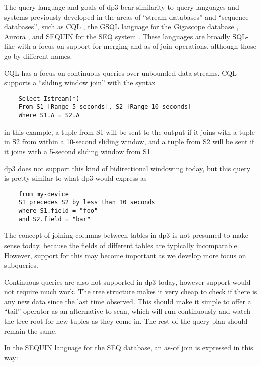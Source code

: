 \documentclass[9pt,twocolumn]{article}
\newcommand{\q}[1]{``#1''}
\begin{document}
    The query language and goals of dp3 bear similarity to query languages and
    systems previously developed in the areas of \q{stream databases} and
    \q{sequence databases}, such as CQL \cite{cql}, the GSQL language for the
    Gigascope database \cite{gigascope}, Aurora \cite{aurora}, and SEQUIN for
    the SEQ system \cite{seq}. These languages are broadly SQL-like with a focus on
    support for merging and as-of join operations, although those go by
    different names.

    CQL has a focus on continuous queries over unbounded data streams. CQL
    supports a \q{sliding window join} with the syntax 

    \begin{lstlisting}
    Select Istream(*)
    From S1 [Range 5 seconds], S2 [Range 10 seconds]
    Where S1.A = S2.A
    \end{lstlisting}

    in this example, a tuple from S1 will be sent to the output if it joins with
    a tuple in S2 from within a 10-second sliding window, and a tuple from S2 will
    be sent if it joins with a 5-second sliding window from S1.

    dp3 does not support this kind of bidirectional windowing today, but this
    query is pretty similar to what dp3 would express as

    \begin{lstlisting}
    from my-device
    S1 precedes S2 by less than 10 seconds
    where S1.field = "foo"
    and S2.field = "bar"
    \end{lstlisting}

    The concept of joining columns between tables in dp3 is not presumed to make
    sense today, because the fields of different tables are typically
    incomparable. However, support for this may become important as we develop
    more focus on subqueries.

    Continuous queries are also not supported in dp3 today, however support
    would not require much work. The tree structure makes it very cheap to
    check if there is any new data since the last time observed. This should
    make it simple to offer a \q{tail} operator as an alternative to scan,
    which will run continuously and watch the tree root for new tuples as they
    come in. The rest of the query plan should remain the same.

    In the SEQUIN language for the SEQ database, an as-of join is expressed in
    this way:
\end{document}
